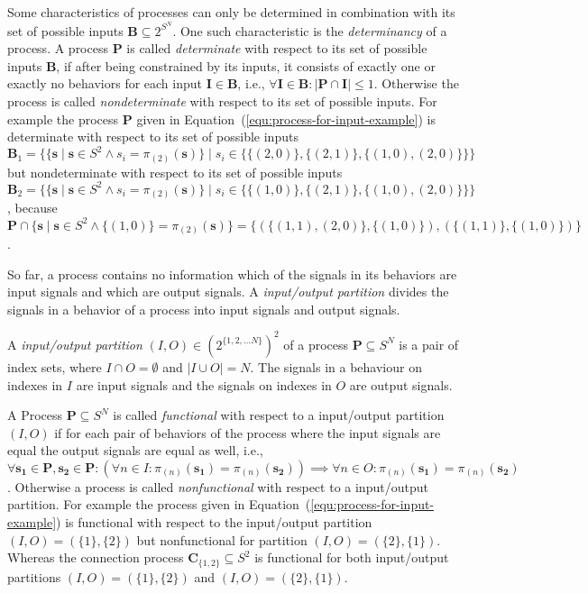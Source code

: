 Some characteristics of processes can only be determined in combination with
its set of possible inputs $\mathbf{B} \subseteq 2^{S^N}$.
One such characteristic is the \emph{determinancy} of a process.
A process $\mathbf{P}$ is called \emph{determinate} with respect
to its set of possible inputs $\mathbf{B}$, if after being
constrained by its inputs, it consists of exactly one or exactly
no behaviors for each input $\mathbf{I} \in \mathbf{B}$,
i.e., $\forall{\mathbf{I} \in \mathbf{B}}: |\mathbf{P} \cap \mathbf{I}| \le 1$.
Otherwise the process is called \emph{nondeterminate} with respect
to its set of possible inputs. For example the process $\mathbf{P}$ given in
Equation~(\ref{equ:process-for-input-example}) is determinate with respect
to its set of possible inputs 
$\mathbf{B}_1 = \{ \{\mathbf{s} \mid \mathbf{s} \in S^2 \wedge s_i = \pi{}_{(2)}(\mathbf{s})\} \mid
                  s_i \in \{\{(2,0)\},\{(2,1)\},\{(1,0),(2,0)\}\} \}$
but nondeterminate with respect to its set of possible inputs 
$\mathbf{B}_2 = \{ \{\mathbf{s} \mid \mathbf{s} \in S^2 \wedge s_i = \pi{}_{(2)}(\mathbf{s})\} \mid
                  s_i \in \{\{(1,0)\},\{(2,1)\},\{(1,0),(2,0)\}\} \}$,
because $\mathbf{P} \cap \{\mathbf{s} \mid \mathbf{s} \in S^2 \wedge \{(1,0)\} = \pi{}_{(2)}(\mathbf{s})\} =
\{(\{(1,1),(2,0)\},\{(1,0)\}),(\{(1,1)\},\{(1,0)\})\}$.

So far, a process contains no information which of the signals in its behaviors are
input signals and which are output signals. A \emph{input/output partition}
divides the signals in a behavior of a process into input signals and output signals.
\begin{sdefinition}
A \emph{input/output partition} $(I,O) \in \left( 2^{\{1,2, \ldots N\}} \right)^2$
of a process $\mathbf{P} \subseteq S^N$ is a pair of index sets,
where $I \cap O = \emptyset$ and $|I \cup O| = N$. The signals in
a behaviour on indexes in $I$ are input signals and the
signals on indexes in $O$ are output signals.
\end{sdefinition}
A Process $\mathbf{P} \subseteq S^N$ is called \emph{functional} with
respect to a input/output partition $(I,O)$ if for each pair of
behaviors of the process where the input signals are equal
the output signals are equal as well,
i.e., $\forall{\mathbf{s_1} \in \mathbf{P}, \mathbf{s_2} \in \mathbf{P}}:
(\forall{n \in I}: \pi{}_{(n)}(\mathbf{s_1}) = \pi{}_{(n)}(\mathbf{s_2})) \implies
 \forall{n \in O}: \pi{}_{(n)}(\mathbf{s_1}) = \pi{}_{(n)}(\mathbf{s_2})$.
Otherwise a process is called \emph{nonfunctional} with respect to a
input/output partition.
For example the process given in Equation~(\ref{equ:process-for-input-example})
is functional with respect to the input/output partition $(I,O) = (\{1\},\{2\})$
but nonfunctional for partition $(I,O) = (\{2\},\{1\})$. Whereas the connection process
$\mathbf{C}_{\{1,2\}} \subseteq S^2$ is functional for both
input/output partitions $(I,O) = (\{1\},\{2\})$ and $(I,O) = (\{2\},\{1\})$.


